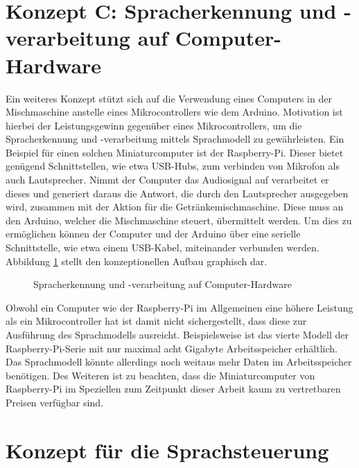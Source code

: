 \section{Konzept C: Spracherkennung und -verarbeitung auf Computer-Hardware}
Ein weiteres Konzept stützt sich auf die Verwendung eines Computers in der Mischmaschine anstelle eines Mikrocontrollers wie dem Arduino.
Motivation ist hierbei der Leistungsgewinn gegenüber eines Mikrocontrollers, um die Spracherkennung und -verarbeitung mittels Sprachmodell zu gewährleisten.
Ein Beispiel für einen solchen Miniaturcomputer ist der Raspberry-Pi.
Dieser bietet genügend Schnittstellen, wie etwa USB-Hubs, zum verbinden von Mikrofon als auch Lautsprecher.
Nimmt der Computer das Audiosignal auf verarbeitet er dieses und generiert daraus die Antwort, die durch den Lautsprecher ausgegeben wird, zusammen mit der Aktion für die Getränkemischmaschine.
Diese muss an den Arduino, welcher die Mischmaschine steuert, übermittelt werden.
Um dies zu ermöglichen können der Computer und der Arduino über eine serielle Schnittstelle, wie etwa einem USB-Kabel, miteinander  verbunden werden.
Abbildung \ref{figure:Konzept_Raspberry} stellt den konzeptionellen Aufbau graphisch dar.
\begin{figure}[H]
    \centering
    \caption{\label{figure:Konzept_Raspberry}Spracherkennung und -verarbeitung auf Computer-Hardware}
\end{figure}
\noindent
Obwohl ein Computer wie der Raspberry-Pi im Allgemeinen eine höhere Leistung als ein Mikrocontroller hat ist damit nicht sichergestellt, dass diese zur Ausführung des Sprachmodells ausreicht.
Beispielsweise ist das vierte Modell der Raspberry-Pi-Serie mit nur maximal acht Gigabyte Arbeitsspeicher erhältlich.
Das Sprachmodell könnte allerdings noch weitaus mehr Daten im Arbeitsspeicher benötigen.
Des Weiteren ist zu beachten, dass die Miniaturcomputer von Raspberry-Pi im Speziellen zum Zeitpunkt dieser Arbeit kaum zu vertretbaren Preisen verfügbar sind.
\section{Konzept für die Sprachsteuerung}
